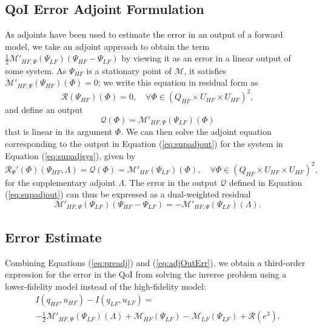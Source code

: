 \subsection{QoI Error Adjoint Formulation}

As adjoints have been used to estimate the error in an output of a forward model, we take an adjoint approach to obtain the term $\frac{1}{2}\mathcal{M}'_{HF,\Psi}(\Psi_{LF})(\Psi_{HF}-\Psi_{LF})$ by viewing it as an error in a linear output of some system. As $\Psi_{HF}$ is a stationary point of $\mathcal{M}$, it satisfies $\mathcal{M}'_{HF,\Psi}(\Psi_{HF})(\Phi)=0$; we write this equation in residual form as
\begin{equation}
\mathscr{R}(\Psi_{HF})(\Phi)=0,\quad\forall\Phi\in(Q_{HF}\times U_{HF}\times U_{HF})^2,
\label{eq:supadjsys}
\end{equation}
and define an output 
\begin{equation}
\mathcal{Q}(\Phi)=\mathcal{M}'_{HF,\Psi}(\Psi_{LF})(\Phi)
\label{eq:supadjout}
\end{equation}
that is linear in its argument $\Phi$. We can then solve the adjoint equation corresponding to the output in Equation (\ref{eq:supadjout}) for the system in Equation (\ref{eq:supadjsys}), given by
\begin{equation}
\mathscr{R}_{\Psi}'(\Phi)(\Psi_{HF},\Lambda)=\mathcal{Q}(\Phi)=\mathcal M'_{HF}(\Psi_{LF})(\Phi),\quad\forall\Phi\in(Q_{HF}\times U_{HF}\times U_{HF})^2,
\label{eq:superAdjEq}
\end{equation}
for the supplementary adjoint $\Lambda$. The error in the output $\mathcal{Q}$ defined in Equation (\ref{eq:supadjout}) can thus be expressed as a dual-weighted residual
\begin{equation}
\mathcal M'_{HF,\Psi}(\Psi_{LF})(\Psi_{HF}-\Psi_{LF})=-\mathcal{M}'_{HF,\Psi}(\Psi_{LF})(\Lambda).
\label{eq:adjOutErr}
\end{equation}

\subsection{Error Estimate}

Combining Equations (\ref{eq:preadj}) and (\ref{eq:adjOutErr}), we obtain a third-order expression for the error in the QoI from solving the inverse problem using a lower-fidelity model instead of the high-fidelity model:
\begin{multline}
I(q_{HF},u_{HF})-I(q_{LF},u_{LF})=\\-\frac{1}{2}\mathcal{M}'_{HF,\Psi}(\Psi_{LF})(\Lambda)+\mathcal M_{HF}(\Psi_{LF})-\mathcal M_{LF}(\Psi_{LF})+\mathcal{R}(e^3).
\label{eq:finErrExp}
\end{multline}

